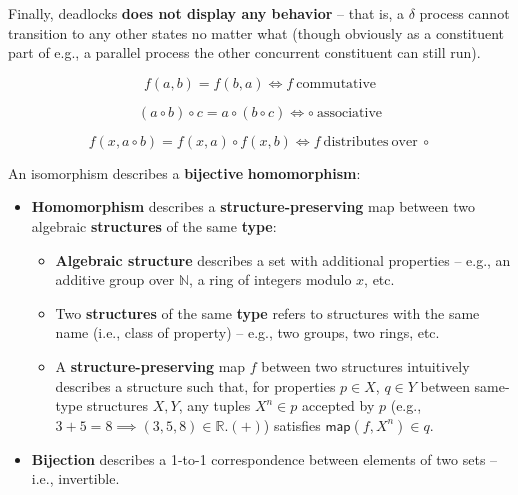 \documentclass[99-notes-packed.tex]{subfiles}
\begin{document}
Finally, deadlocks \textbf{does not display any behavior} -- that is, a $\delta$ process cannot transition to any other states no matter what (though obviously as a constituent part of e.g., a parallel process the other concurrent constituent can still run). 

\begin{background}[commutativity]
    \begin{equation*}
        f(a, b) = f(b, a) \iff f\ \mathrm{commutative}
    \end{equation*}
\end{background}

\begin{background}[associativity]
    \begin{equation*}
        (a \circ b) \circ c = a \circ (b \circ c) \iff \circ\ \mathrm{associative}
    \end{equation*}
\end{background}

\begin{background}[distributivity]
    \begin{equation*}
        f(x, a \circ b) = f(x, a) \circ f(x, b) \iff f\ \mathrm{distributes\ over}\ \circ
    \end{equation*}
\end{background}

\begin{background}[isomorphism]
    An isomorphism describes a \textbf{bijective} \textbf{homomorphism}: 
    \begin{itemize}
        \item {
            \textbf{Homomorphism} describes a \textbf{structure-preserving} map between two algebraic \textbf{structures} of the same \textbf{type}: 
            \begin{itemize}
                \item {
                    \textbf{Algebraic structure} describes a set with additional properties -- e.g., an additive group over $\mathbb{N}$, a ring of integers modulo $x$, etc. 
                }
                \item {
                    Two \textbf{structures} of the same \textbf{type} refers to structures with the same name (i.e., class of property) -- e.g., two groups, two rings, etc. 
                }
                \item {
                    A \textbf{structure-preserving} map $f$ between two structures intuitively describes a structure such that, for properties $p \in X$, $q \in Y$ between same-type structures $X, Y$, any tuples $X^n \in p$ accepted by $p$ (e.g., $3 + 5 = 8 \implies (3, 5, 8) \in \mathbb{R}.(+)$) satisfies $\mathsf{map}(f, X^n) \in q$. 
                }
            \end{itemize}
        }
        \item {
            \textbf{Bijection} describes a 1-to-1 correspondence between elements of two sets -- i.e., invertible. 
        }
    \end{itemize}
\end{background}
\end{document}
